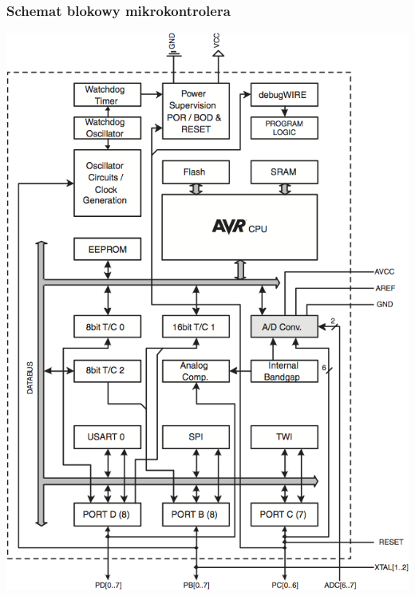 \documentclass[8pt]{beamer}
\begin{document}
\begin{frame}
  \frametitle{Schemat blokowy mikrokontrolera}

  \begin{center}
    \includegraphics[scale=0.5]{images/atmega328p.png}
  \end{center}
\end{frame}
\end{document}
